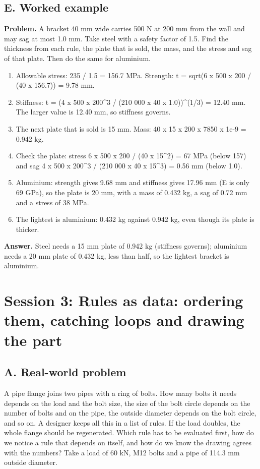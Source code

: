 \documentclass[11pt,a4paper]{article}
\begin{document}
\subsection*{E. Worked example}
\textbf{Problem.} A bracket 40 mm wide carries 500 N at 200 mm from the wall and may sag at most 1.0 mm. Take steel with a safety factor of 1.5. Find the thickness from each rule, the plate that is sold, the mass, and the stress and sag of that plate. Then do the same for aluminium.

\begin{enumerate}[nosep]
\item Allowable stress: 235 / 1.5 = 156.7 MPa. Strength: t = sqrt(6 x 500 x 200 / (40 x 156.7)) = 9.78 mm.
\item Stiffness: t = (4 x 500 x 200\textasciicircum{}3 / (210 000 x 40 x 1.0))\textasciicircum{}(1/3) = 12.40 mm. The larger value is 12.40 mm, so stiffness governs.
\item The next plate that is sold is 15 mm. Mass: 40 x 15 x 200 x 7850 x 1e-9 = 0.942 kg.
\item Check the plate: stress 6 x 500 x 200 / (40 x 15\textasciicircum{}2) = 67 MPa (below 157) and sag 4 x 500 x 200\textasciicircum{}3 / (210 000 x 40 x 15\textasciicircum{}3) = 0.56 mm (below 1.0).
\item Aluminium: strength gives 9.68 mm and stiffness gives 17.96 mm (E is only 69 GPa), so the plate is 20 mm, with a mass of 0.432 kg, a sag of 0.72 mm and a stress of 38 MPa.
\item The lightest is aluminium: 0.432 kg against 0.942 kg, even though its plate is thicker.
\end{enumerate}
\textbf{Answer.} Steel needs a 15 mm plate of 0.942 kg (stiffness governs); aluminium needs a 20 mm plate of 0.432 kg, less than half, so the lightest bracket is aluminium.

\section{Session 3: Rules as data: ordering them, catching loops and drawing the part}

\subsection*{A. Real-world problem}
A pipe flange joins two pipes with a ring of bolts. How many bolts it needs depends on the load and the bolt size, the size of the bolt circle depends on the number of bolts and on the pipe, the outside diameter depends on the bolt circle, and so on. A designer keeps all this in a list of rules. If the load doubles, the whole flange should be regenerated. Which rule has to be evaluated first, how do we notice a rule that depends on itself, and how do we know the drawing agrees with the numbers? Take a load of 60 kN, M12 bolts and a pipe of 114.3 mm outside diameter.
\end{document}

